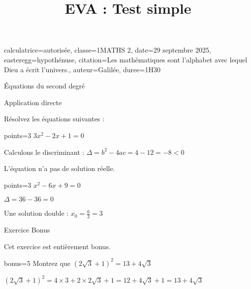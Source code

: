 \documentclass[correction]{nfdevoirs}
\title{EVA : Test simple}
\begin{document}
\begin{devoir}{
  calculatrice=autorisée,
  classe={1MATHS 2},
  date={29 septembre 2025},
  easteregg={hypothénuse},
  citation={Les mathématiques sont l'alphabet avec lequel Dieu a écrit l'univers.},
  auteur={Galilée},
  duree={1H30}
}

\begin{partie}{Équations du second degré}
  
  \begin{exercice}{Application directe}
    
    Résolvez les équations suivantes :
    
    \begin{question}{points=3}
      $3x^2 - 2x + 1 = 0$
    \end{question}
    
    \begin{correction}
      Calculons le discriminant : $\Delta = b^2 - 4ac = 4 - 12 = -8 < 0$
      
      L'équation n'a pas de solution réelle.
    \end{correction}
    
    \begin{question}{points=3}
      $x^2 - 6x + 9 = 0$
    \end{question}
    
    \begin{correction}
      $\Delta = 36 - 36 = 0$
      
      Une solution double : $x_0 = \frac{6}{2} = 3$
    \end{correction}
    
  \end{exercice}
  
  \begin{exercice}{Exercice Bonus}
    
    Cet exercice est entièrement bonus.
    
    \begin{question}{bonus=5}
      Montrez que $(2\sqrt{3} + 1)^2 = 13 + 4\sqrt{3}$
    \end{question}
    
    \begin{correction}
      $(2\sqrt{3} + 1)^2 = 4 \times 3 + 2 \times 2\sqrt{3} + 1 = 12 + 4\sqrt{3} + 1 = 13 + 4\sqrt{3}$
    \end{correction}
    
  \end{exercice}
  
\end{partie}

\end{devoir}
\end{document}
